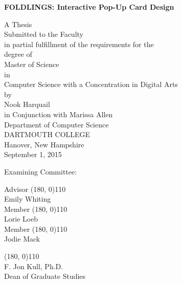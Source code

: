 \pagestyle{plain}
\begin{center}
\textbf{FOLDLINGS: Interactive Pop-Up Card Design}
\vspace{0.4cm}

A Thesis\\ [0.4cm]
Submitted to the Faculty \\ [0.4cm]
in partial fulfillment of the requirements for the \\[0.4cm]
degree of \\[0.4cm]
Master of Science\\in\\Computer Science with a Concentration in Digital Arts\\[0.4cm]
by\\[0.5cm]
Nook Harquail\\[0.4cm]
in Conjunction with Marissa Allen \\[0.5cm]
Department of Computer Science \\ [0.4cm]
DARTMOUTH COLLEGE \\ [0.4cm]
Hanover, New Hampshire \\[0.4cm]
September 1, 2015 %
\vspace{1.5cm}

\end{center}

Examining Committee:

\begin{flushright}
Advisor \line(180, 0){110} \\
Emily Whiting \\[1cm]

Member \line(180, 0){110} \\
Lorie Loeb \\[1cm]

Member \line(180, 0){110} \\
Jodie Mack \\[1cm]



\end{flushright}

\begin{flushleft}
\line(180, 0){110} \\
F. Jon Kull, Ph.D.\\
Dean of Graduate Studies\\[1cm]
\end{flushleft}
